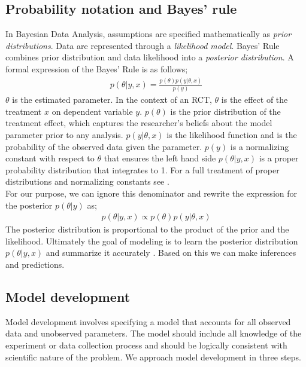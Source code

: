 \documentclass{article}
\begin{document}
\subsection{Probability notation and Bayes' rule}
In Bayesian Data Analysis, assumptions are specified mathematically as \textit{prior distributions}.  Data are represented through a \textit{likelihood model}. Bayes' Rule combines prior distribution and data likelihood into a \textit{posterior distribution}.  A formal expression of the Bayes' Rule is as follows;
\begin{align}
{p(\theta| y, x) = \frac{ p(\theta) p(y|\theta, x)}{p(y)}}
\end{align}
$\theta$ is the estimated parameter. In the context of an RCT, $\theta$ is the effect of the treatment $x$ on dependent variable $y$. $p(\theta)$ is the prior distribution of the treatment effect, which captures the researcher's beliefs about the model parameter prior to any analysis. $p(y | \theta, x)$ is the likelihood function and is the probability of the observed data given the parameter.  $p(y)$ is a normalizing constant with respect to $\theta$ that ensures the left hand side $p(\theta |y, x)$ is a proper probability distribution that integrates to 1. For a full treatment of proper distributions and normalizing constants see . \\
For our purpose, we can ignore this denominator and rewrite the expression for the posterior $p(\theta | y)$ as;
 \begin{align}
 p(\theta | y, x) \propto p(\theta) p(y |\theta, x)
 \end{align}
The posterior distribution is proportional to the product of the prior and the likelihood. Ultimately the goal of modeling is to learn the posterior distribution $p(\theta|y, x)$ and summarize it accurately \cite{gelman2014bayesian}. Based on this we can make inferences and predictions.

\subsection{Model development}
Model development involves specifying a model that accounts for all observed data and unobserved parameters. The model should include all knowledge of the experiment or data collection process and should be logically consistent with scientific nature of the problem. We approach model development in three steps.
\end{document}

